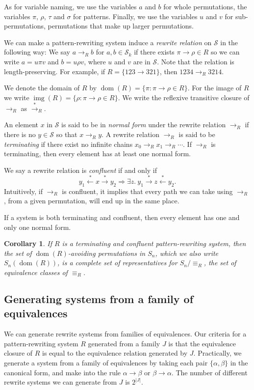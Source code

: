 \documentclass[a4paper, 11pt, english]{article}
\newcommand{\patternrule}{ \to \!}
\newtheorem{corollary}[theorem]{Corollary}
\theoremstyle{definition}
\newcommand{\Sym}{\mathcal{S}}
\newcommand{\from}{\leftarrow}
\newcommand{\tostar}{\stackrel{*}{\to}}
\newcommand{\fromstar}{\stackrel{*}{\from}}
\DeclareMathOperator{\dom}{dom}
\DeclareMathOperator{\img}{img}
\begin{document}
As for variable naming, we use the variables $a$ and $b$ for whole permutations, 
the variables $\pi$, $\rho$, $\tau$ and $\sigma$ for patterns.
Finally, we use the variables $u$ and $v$ for sub-permutations, permutations that make up larger
permutations.

We can make a pattern-rewriting system induce a \emph{rewrite relation} on $\Sym$ in the following way: We say
$a \to_R b$ for $a, b \in \Sym_k$ if there exists $\pi \patternrule \rho \in R$ so
we can write $a = u \pi v$ and $b = u \rho v$, where
$u$ and $v$ are in $\Sym$. Note that the relation is
length-preserving. For example, if $R = \{123 \patternrule 321\}$, then $1234 \to_R 3214$. 

We denote the domain of $R$ by $\dom(R) = \{\pi : \pi \patternrule
\rho \in R\}$. For the image of $R$ we write $\img(R) = \{\rho : \pi
\patternrule \rho \in R\}$. We write the reflexive transitive closure of
$\to_R$ as $\tostar_R$. 

An element $x$ in $\Sym$ is said to be in \emph{normal form} under the rewrite relation $\to_R$
if there is no $y \in \Sym$ so that $x \to_R y$. A rewrite relation $\to_R$ is said to be
\emph{terminating} if there exist no infinite chains $x_0 \to_R x_1 \to_R \cdots$. If
$\to_R$ is terminating, then every element has at least one normal form. 

We say a rewrite relation is \emph{confluent} if and only if
$$
    y_1 \fromstar x \tostar y_2 \Longrightarrow 
    \exists z. \  y_1 \tostar z \fromstar y_2.
$$
Intuitively, if $\to_R$ is confluent, it implies that every path we can
take using $\to_R$, from a given permutation, will end up in the same place. 

If a system is both terminating and confluent, then every element has one and
only one normal form.

\begin{corollary}
    If $R$ is a terminating and confluent pattern-rewriting system, then the set of
    $\dom(R)$-avoiding permutations in $S_n$, which we also write $S_n(\dom(R))$, is a complete set of
    representatives for $S_n / \equiv_R$, the set of equivalence classes of $\equiv_R$.
\end{corollary}

\subsection{Generating systems from a family of equivalences}

We can generate rewrite systems from families of equivalences. Our criteria for a pattern-rewriting
system $R$ generated from a family $J$ is that the equivalence closure of $R$ is equal to the
equivalence relation generated by $J$. 
Practically, we generate a system from a family of equivalences by taking each pair $\{\alpha, \beta
\}$ in the canonical form, and make into the rule $\alpha \patternrule \beta$ or $\beta \patternrule
\alpha$. The number of different rewrite systems we can generate from $J$ is $2^{|J|}$.
\end{document}
